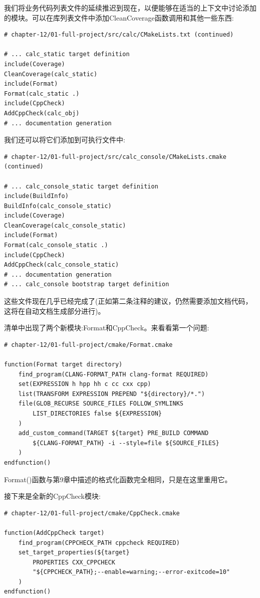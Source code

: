 
我们将业务代码列表文件的延续推迟到现在，以便能够在适当的上下文中讨论添加的模块。可以在库列表文件中添加CleanCoverage函数调用和其他一些东西:

\begin{lstlisting}[style=styleCMake]
# chapter-12/01-full-project/src/calc/CMakeLists.txt (continued)

# ... calc_static target definition
include(Coverage)
CleanCoverage(calc_static)
include(Format)
Format(calc_static .)
include(CppCheck)
AddCppCheck(calc_obj)
# ... documentation generation
\end{lstlisting}

我们还可以将它们添加到可执行文件中:

\begin{lstlisting}[style=styleCMake]
# chapter-12/01-full-project/src/calc_console/CMakeLists.cmake (continued)

# ... calc_console_static target definition
include(BuildInfo)
BuildInfo(calc_console_static)
include(Coverage)
CleanCoverage(calc_console_static)
include(Format)
Format(calc_console_static .)
include(CppCheck)
AddCppCheck(calc_console_static)
# ... documentation generation
# ... calc_console bootstrap target definition
\end{lstlisting}

这些文件现在几乎已经完成了(正如第二条注释的建议，仍然需要添加文档代码，这将在自动文档生成部分进行)。

清单中出现了两个新模块:Format和CppCheck。来看看第一个问题:

\begin{lstlisting}[style=styleCMake]
# chapter-12/01-full-project/cmake/Format.cmake

function(Format target directory)
	find_program(CLANG-FORMAT_PATH clang-format REQUIRED)
	set(EXPRESSION h hpp hh c cc cxx cpp)
	list(TRANSFORM EXPRESSION PREPEND "${directory}/*.")
	file(GLOB_RECURSE SOURCE_FILES FOLLOW_SYMLINKS
		LIST_DIRECTORIES false ${EXPRESSION}
	)
	add_custom_command(TARGET ${target} PRE_BUILD COMMAND
		${CLANG-FORMAT_PATH} -i --style=file ${SOURCE_FILES}
	)
endfunction()
\end{lstlisting}

Format()函数与第9章中描述的格式化函数完全相同，只是在这里重用它。

接下来是全新的CppCheck模块:

\begin{lstlisting}[style=styleCMake]
# chapter-12/01-full-project/cmake/CppCheck.cmake

function(AddCppCheck target)
	find_program(CPPCHECK_PATH cppcheck REQUIRED)
	set_target_properties(${target}
		PROPERTIES CXX_CPPCHECK
		"${CPPCHECK_PATH};--enable=warning;--error-exitcode=10"
	)
endfunction()
\end{lstlisting}

